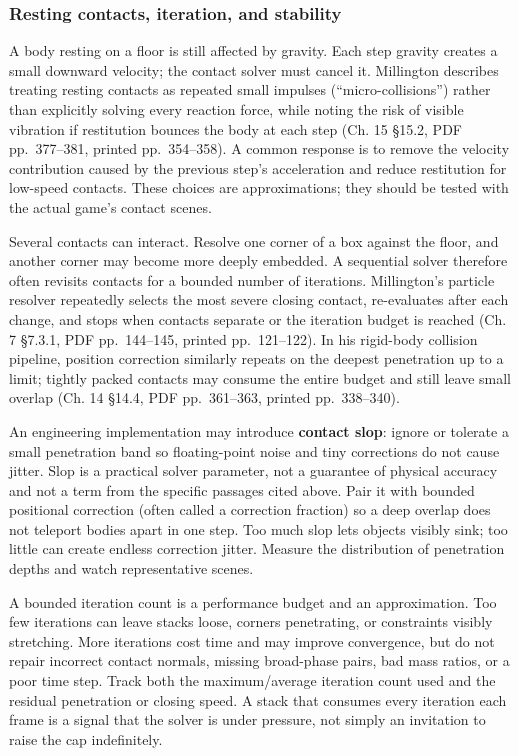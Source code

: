\subsubsection{Resting contacts, iteration, and stability}\label{06-engine-ii-ch033-resting-contacts-iteration-and-stability}

A body resting on a floor is still affected by gravity. Each step gravity creates a small downward velocity; the contact solver must cancel it. Millington describes treating resting contacts as repeated small impulses (``micro-collisions'') rather than explicitly solving every reaction force, while noting the risk of visible vibration if restitution bounces the body at each step (Ch. 15 §15.2, PDF pp.~377--381, printed pp.~354--358). A common response is to remove the velocity contribution caused by the previous step's acceleration and reduce restitution for low-speed contacts. These choices are approximations; they should be tested with the actual game's contact scenes.

Several contacts can interact. Resolve one corner of a box against the floor, and another corner may become more deeply embedded. A sequential solver therefore often revisits contacts for a bounded number of iterations. Millington's particle resolver repeatedly selects the most severe closing contact, re-evaluates after each change, and stops when contacts separate or the iteration budget is reached (Ch. 7 §7.3.1, PDF pp.~144--145, printed pp.~121--122). In his rigid-body collision pipeline, position correction similarly repeats on the deepest penetration up to a limit; tightly packed contacts may consume the entire budget and still leave small overlap (Ch. 14 §14.4, PDF pp.~361--363, printed pp.~338--340).

An engineering implementation may introduce \textbf{contact slop}: ignore or tolerate a small penetration band so floating-point noise and tiny corrections do not cause jitter. Slop is a practical solver parameter, not a guarantee of physical accuracy and not a term from the specific passages cited above. Pair it with bounded positional correction (often called a correction fraction) so a deep overlap does not teleport bodies apart in one step. Too much slop lets objects visibly sink; too little can create endless correction jitter. Measure the distribution of penetration depths and watch representative scenes.

A bounded iteration count is a performance budget and an approximation. Too few iterations can leave stacks loose, corners penetrating, or constraints visibly stretching. More iterations cost time and may improve convergence, but do not repair incorrect contact normals, missing broad-phase pairs, bad mass ratios, or a poor time step. Track both the maximum/average iteration count used and the residual penetration or closing speed. A stack that consumes every iteration each frame is a signal that the solver is under pressure, not simply an invitation to raise the cap indefinitely.

